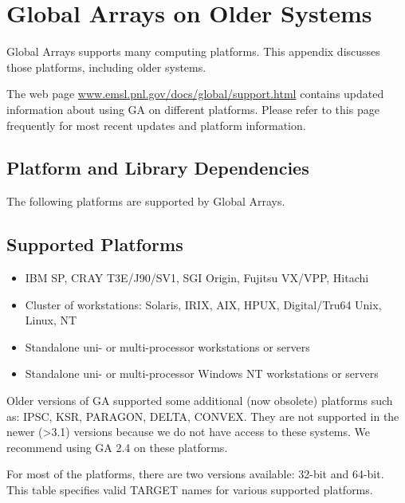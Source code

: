 \chapter{Global Arrays on Older Systems}

Global Arrays supports many computing platforms.  This appendix discusses those
platforms, including older systems.

The web page \url{www.emsl.pnl.gov/docs/global/support.html} contains updated
information about using GA on different platforms. Please refer to this page
frequently for most recent updates and platform information. 

\section{Platform and Library Dependencies }

The following platforms are supported by Global Arrays. 


\section{Supported Platforms}
\begin{itemize}
\item IBM SP, CRAY T3E/J90/SV1, SGI Origin, Fujitsu VX/VPP, Hitachi 
\item Cluster of workstations: Solaris, IRIX, AIX, HPUX, Digital/Tru64 Unix,
Linux, NT 
\item Standalone uni- or multi-processor workstations or servers 
\item Standalone uni- or multi-processor Windows NT workstations or servers
\end{itemize}
Older versions of GA supported some additional (now obsolete) platforms
such as: IPSC, KSR, PARAGON, DELTA, CONVEX. They are not supported
in the newer (>3.1) versions because we do not have access to these
systems. We recommend using GA 2.4 on these platforms.

For most of the platforms, there are two versions available: 32-bit
and 64-bit. This table specifies valid TARGET names for various supported
platforms. 

